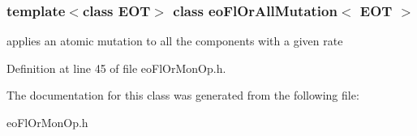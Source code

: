 \subsubsection*{template$<$class EOT$>$ class eo\-Fl\-Or\-All\-Mutation$<$ EOT $>$}

applies an atomic mutation to all the components with a given rate 



Definition at line 45 of file eo\-Fl\-Or\-Mon\-Op.h.

The documentation for this class was generated from the following file:\begin{CompactItemize}
\item 
eo\-Fl\-Or\-Mon\-Op.h\end{CompactItemize}
